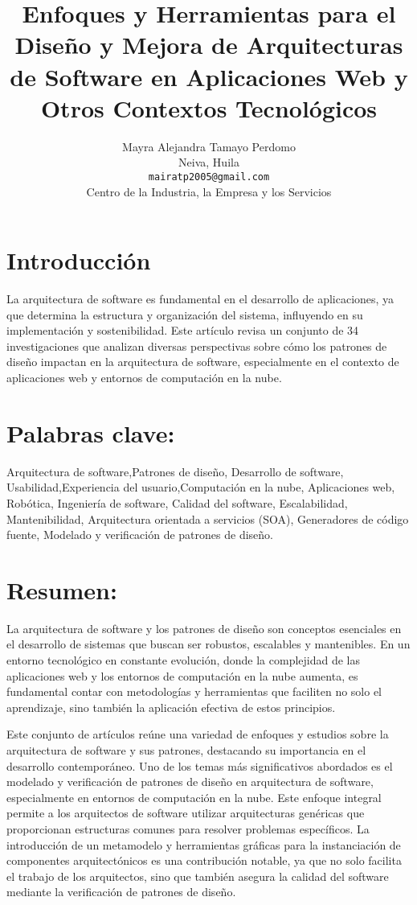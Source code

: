 \documentclass[twocolumn]{article}
\title{Enfoques y Herramientas para el Diseño y Mejora de Arquitecturas
de Software en Aplicaciones Web y Otros Contextos Tecnológicos}
\author{Mayra Alejandra Tamayo Perdomo \\
Neiva, Huila \\
\texttt{mairatp2005@gmail.com} \\
Centro de la Industria, la Empresa y los Servicios}
\begin{document}
\maketitle

\section{Introducción}
La arquitectura de software es fundamental en el desarrollo de
aplicaciones, ya que determina la estructura y organización del sistema,
influyendo en su implementación y sostenibilidad. Este artículo revisa
un conjunto de 34 investigaciones que analizan diversas perspectivas
sobre cómo los patrones de diseño impactan en la arquitectura de
software, especialmente en el contexto de aplicaciones web y entornos de
computación en la nube.

\section{Palabras clave:} Arquitectura de software,Patrones de diseño, Desarrollo de software, Usabilidad,Experiencia del usuario,Computación en la nube, Aplicaciones web, Robótica, Ingeniería de software, Calidad del software, Escalabilidad, Mantenibilidad, Arquitectura orientada a servicios (SOA), Generadores de código fuente, Modelado y verificación de patrones de diseño.

\section{Resumen:}

La arquitectura de software y los patrones de diseño son conceptos esenciales en el desarrollo de sistemas que buscan ser robustos, escalables y mantenibles. En un entorno tecnológico en constante evolución, donde la complejidad de las aplicaciones web y los entornos de computación en la nube aumenta, es fundamental contar con metodologías y herramientas que faciliten no solo el aprendizaje, sino también la aplicación efectiva de estos principios.

Este conjunto de artículos reúne una variedad de enfoques y estudios sobre la arquitectura de software y sus patrones, destacando su importancia en el desarrollo contemporáneo.
Uno de los temas más significativos abordados es el modelado y verificación de patrones de diseño en arquitectura de software, especialmente en entornos de computación en la nube. Este enfoque integral permite a los arquitectos de software utilizar arquitecturas genéricas que proporcionan estructuras comunes para resolver problemas específicos. La introducción de un metamodelo y herramientas gráficas para la instanciación de componentes arquitectónicos es una contribución notable, ya que no solo facilita el trabajo de los arquitectos, sino que también asegura la calidad del software mediante la verificación de patrones de diseño. 
\end{document}
